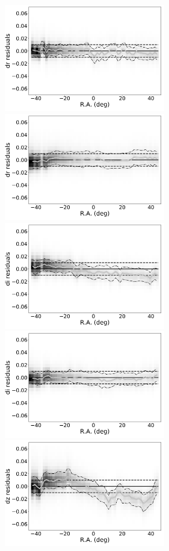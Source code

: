 \documentclass[fleqn,usenatbib]{mnras}
\begin{document}
\begin{figure}[th!]
    \centering\includegraphics[width=7cm]{figures/colorResidDES42bright_dr_RA_Hess.png}
    \centering\includegraphics[width=7cm]{figures/colorResidPSDR2v42bright_dr_RA_Hess.png}
    \centering\includegraphics[width=7cm]{figures/colorResidDES42bright_di_RA_Hess.png}
    \centering\includegraphics[width=7cm]{figures/colorResidPSDR2v42bright_di_RA_Hess.png}
    \centering\includegraphics[width=7cm]{figures/colorResidDES42bright_dz_RA_Hess.png}

\end{figure}
\end{document}
